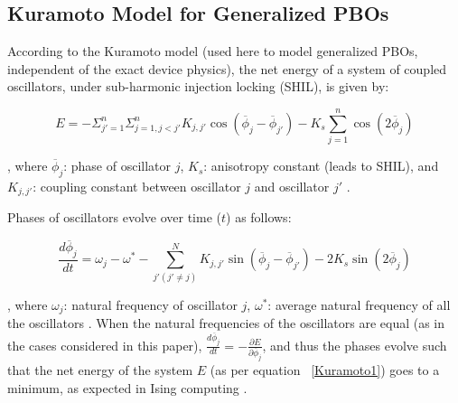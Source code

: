 \documentclass[10pt]{article}
\begin{document}
\subsection{Kuramoto Model for Generalized PBOs}



According to the Kuramoto model (used here to model generalized PBOs, independent of the exact device physics), the net energy of a system of coupled oscillators, under sub-harmonic injection locking (SHIL), is given by:

\begin{equation}
E=-\Sigma_{j'=1}^{n}\Sigma_{j=1,j < j'}^{n}K_{j,j'}\cos(\overline{\phi}_{j}-\overline{\phi}_{j'}) 
-K_{s}\sum_{j=1}^{n}\cos (2\overline{\phi}_{j})
\label{Kuramoto1}
\end{equation}

, where $\overline{\phi}_j$: phase of oscillator $j$, $K_s$: anisotropy constant (leads to SHIL), and $K_{j,j'}$: coupling constant between oscillator $j$ and oscillator $j'$ \cite{Spin_Liu}. 







Phases of oscillators evolve over time ($t$) as follows:

\begin{equation}
\frac{d\overline{\phi}_j}{dt}=\omega _{j}-\omega^{*} - \sum _{j'(j'\ne j)}^{N}K_{j,j'}\sin (\overline{\phi}_{j}-\overline{\phi}_{j'})-2K_{s}\sin (2\overline{\phi}_{j})
\label{Kuramoto2}
\end{equation}

, where $\omega_j$: natural frequency of oscillator $j$,   $\omega^{*}$: average natural frequency of all the oscillators \cite{Spin_Liu}. When the natural frequencies of the oscillators are equal (as in the cases considered in this paper), $\frac{d \overline{\phi}_j}{dt} = -\frac{\partial E}{\partial\overline{\phi}_j}$, and thus the phases evolve such that the net energy of the system $E$ (as per equation ~\ref{Kuramoto1}) goes to a minimum, as expected in Ising computing \cite{Spin_Liu}. 
\end{document}
